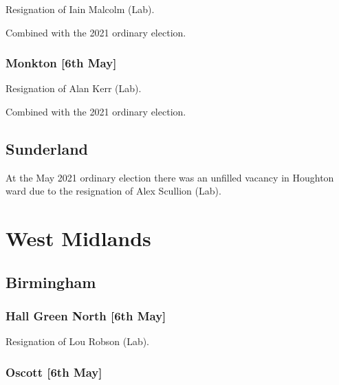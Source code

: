 \documentclass[a4paper,openany]{book}
\begin{document}
\begin{resultsiii}

Resignation of Iain Malcolm (Lab).

Combined with the 2021 ordinary election.

\subsubsection*{Monkton \hspace*{\fill}\nolinebreak[1]%
	\enspace\hspace*{\fill}
	[6th May]}


Resignation of Alan Kerr (Lab).

Combined with the 2021 ordinary election.

\subsection*{Sunderland}

At the May 2021 ordinary election there was an unfilled vacancy in Houghton ward due to the resignation of Alex Scullion (Lab).

\section{West Midlands}

\subsection*{Birmingham}

\subsubsection*{Hall Green North \hspace*{\fill}\nolinebreak[1]%
	\enspace\hspace*{\fill}
	[6th May]}


Resignation of Lou Robson (Lab).

\subsubsection*{Oscott \hspace*{\fill}\nolinebreak[1]%
	\enspace\hspace*{\fill}
	[6th May]}


\end{resultsiii}
\end{document}
